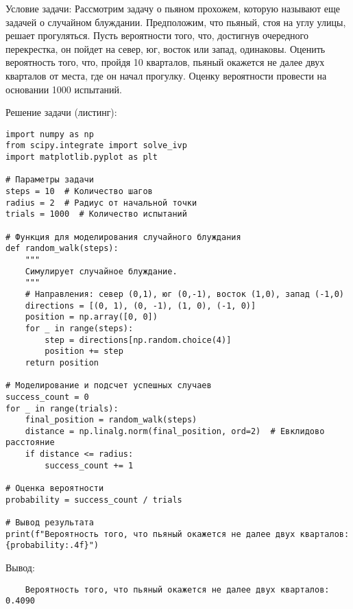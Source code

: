 Условие задачи: Рассмотрим задачу о пьяном прохожем, которую называют еще задачей о случайном блуждании. Предположим, что пьяный, стоя на углу улицы, решает прогуляться. Пусть вероятности того, что, достигнув очередного перекрестка, он пойдет на север, юг, восток или запад, одинаковы. Оценить вероятность того, что, пройдя 10 кварталов, пьяный окажется не далее двух кварталов от места, где он начал прогулку. Оценку вероятности провести на основании 1000 испытаний.

Решение задачи (листинг):

\begin{verbatim}
import numpy as np
from scipy.integrate import solve_ivp
import matplotlib.pyplot as plt

# Параметры задачи
steps = 10  # Количество шагов
radius = 2  # Радиус от начальной точки
trials = 1000  # Количество испытаний

# Функция для моделирования случайного блуждания
def random_walk(steps):
    """
    Симулирует случайное блуждание.
    """
    # Направления: север (0,1), юг (0,-1), восток (1,0), запад (-1,0)
    directions = [(0, 1), (0, -1), (1, 0), (-1, 0)]
    position = np.array([0, 0])
    for _ in range(steps):
        step = directions[np.random.choice(4)]
        position += step
    return position

# Моделирование и подсчет успешных случаев
success_count = 0
for _ in range(trials):
    final_position = random_walk(steps)
    distance = np.linalg.norm(final_position, ord=2)  # Евклидово расстояние
    if distance <= radius:
        success_count += 1

# Оценка вероятности
probability = success_count / trials

# Вывод результата
print(f"Вероятность того, что пьяный окажется не далее двух кварталов: {probability:.4f}")
\end{verbatim}

Вывод:
\begin{verbatim}
    Вероятность того, что пьяный окажется не далее двух кварталов: 0.4090
\end{verbatim}